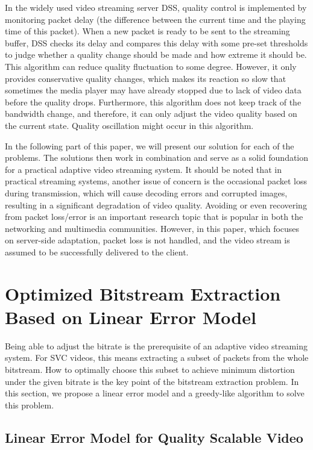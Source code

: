\documentclass[journal]{IEEEtran}
\begin{document}
In the widely used video streaming server DSS, quality control is implemented by monitoring packet delay (the difference between the current time and the playing time of this packet). When a new packet is ready to be sent to the streaming buffer, DSS checks its delay and compares this delay with some pre-set thresholds to judge whether a quality change should be made and how extreme it should be. This algorithm can reduce quality fluctuation to some degree. However, it only provides conservative quality changes, which makes its reaction so slow that sometimes the media player may have already stopped due to lack of video data before the quality drops. Furthermore, this algorithm does not keep track of the bandwidth change, and therefore, it can only adjust the video quality based on the current state. Quality oscillation might occur in this algorithm.

In the following part of this paper, we will present our solution for each of the problems. The solutions then work in combination and serve as a solid foundation for a practical adaptive video streaming system. It should be noted that in practical streaming systems, another issue of concern is the occasional packet loss during transmission, which will cause decoding errors and corrupted images, resulting in a significant degradation of video quality. Avoiding or even recovering from packet loss/error is an important research topic that is popular in both the networking and multimedia communities. However, in this paper, which focuses on server-side adaptation, packet loss is not handled, and the video stream is assumed to be successfully delivered to the client.

\section{Optimized Bitstream Extraction Based on Linear Error Model}
\label{sec:bitstream-extraction}

Being able to adjust the bitrate is the prerequisite of an adaptive video streaming system. For SVC videos, this means extracting a subset of packets from the whole bitstream. How to optimally choose this subset to achieve minimum distortion under the given bitrate is the key point of the bitstream extraction problem. In this section, we propose a linear error model and a greedy-like algorithm to solve this problem.

\subsection{Linear Error Model for Quality Scalable Video}
\label{subsec:linear-model}
\end{document}
